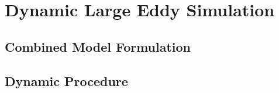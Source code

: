  
\chapter{Dynamic Large Eddy Simulation}
\label{sec:dynLES}

\section{Combined Model Formulation}
\label{sec:combForm}


\section{Dynamic Procedure}
\label{sec:dynProc}


